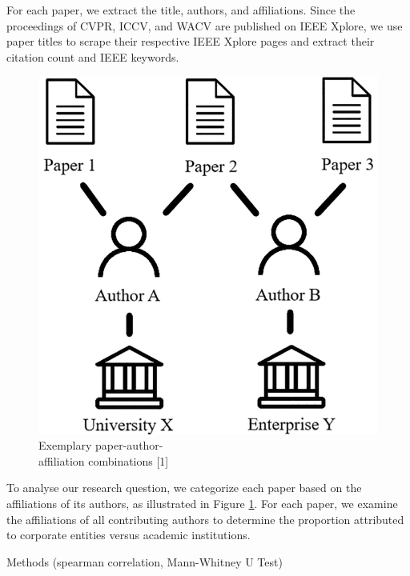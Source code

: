 \documentclass{article}
\begin{document}
For each paper, we extract the title, authors, and affiliations. Since the proceedings of CVPR, ICCV, and WACV are published on IEEE Xplore, we use paper titles to scrape their respective IEEE Xplore pages and extract their citation count and IEEE keywords.

\begin{figure}
\centering
\vspace{-10pt}
\includegraphics[width=.95\linewidth]{report/images/affiliation-combination.png}
\caption{Exemplary paper-author-\\
affiliation combinations [1]}
\label{fig:affiliation-combination}
\vspace{-50pt}
\end{figure}
To analyse our research question, we categorize each paper based on the affiliations of its authors, as illustrated in Figure \ref{fig:affiliation-combination}. For each paper, we examine the affiliations of all contributing authors to determine the proportion attributed to corporate entities versus academic institutions.




Methods (spearman correlation, Mann-Whitney U Test)
\end{document}
